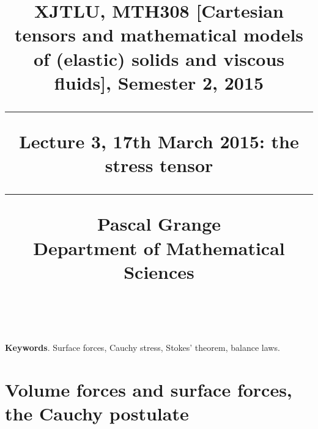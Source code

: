 \documentclass[DIV=12]{article}
\begin{document}


\title{
\noindent\hrulefill
\begin{flushleft}
{\Large \bf{XJTLU, MTH308 [Cartesian tensors and mathematical models of (elastic) solids and viscous fluids], Semester 2, 2015\\
\vspace{8mm}
\hrule
\vspace{6mm}
 Lecture 3, 17th March 2015: the stress tensor}}
\vspace{8mm}
\hrule
\vspace{6mm}
{\Large{Pascal Grange\\
Department of Mathematical Sciences\\
{}\\
}}
\noindent\hrulefill
\end{flushleft}}
\date{}
\author{}
\maketitle
\vspace{-3mm}

{\bf{Keywords}}. Surface forces, Cauchy stress, Stokes' theorem, balance laws.\\
\vspace{3mm}

\tableofcontents

\vspace{12mm}

\section{Volume forces and surface forces, the Cauchy  postulate}
\end{document}
